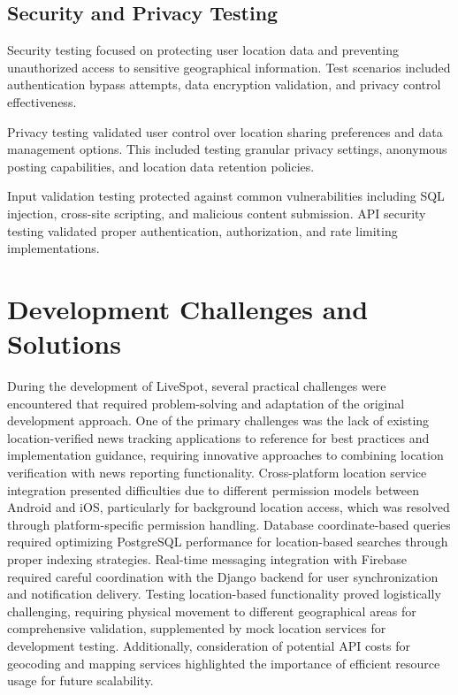 \subsection{Security and Privacy Testing}
\label{subsec:security-testing}

Security testing focused on protecting user location data and preventing unauthorized access to sensitive geographical information. Test scenarios included authentication bypass attempts, data encryption validation, and privacy control effectiveness.

Privacy testing validated user control over location sharing preferences and data management options. This included testing granular privacy settings, anonymous posting capabilities, and location data retention policies.

Input validation testing protected against common vulnerabilities including SQL injection, cross-site scripting, and malicious content submission. API security testing validated proper authentication, authorization, and rate limiting implementations.

\section{Development Challenges and Solutions}
\label{sec:challenges-solutions}

During the development of LiveSpot, several practical challenges were encountered that required problem-solving and adaptation of the original development approach. One of the primary challenges was the lack of existing location-verified news tracking applications to reference for best practices and implementation guidance, requiring innovative approaches to combining location verification with news reporting functionality. Cross-platform location service integration presented difficulties due to different permission models between Android and iOS, particularly for background location access, which was resolved through platform-specific permission handling. Database coordinate-based queries required optimizing PostgreSQL performance for location-based searches through proper indexing strategies. Real-time messaging integration with Firebase required careful coordination with the Django backend for user synchronization and notification delivery. Testing location-based functionality proved logistically challenging, requiring physical movement to different geographical areas for comprehensive validation, supplemented by mock location services for development testing. Additionally, consideration of potential API costs for geocoding and mapping services highlighted the importance of efficient resource usage for future scalability.

